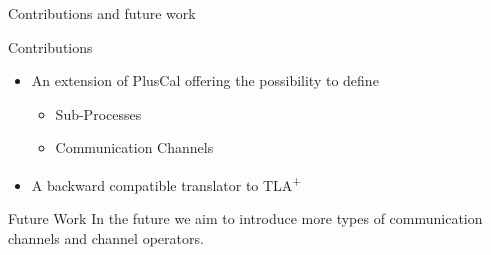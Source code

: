 \documentclass{beamer}
\newcommand{\tlaplus}{TLA\textsuperscript{+}\xspace}
\begin{document}
\begin{frame}{Contributions and future work}
\begin{block}{Contributions}
\begin{itemize}
    \item An extension of PlusCal offering the possibility to define
        \begin{itemize}
            \item Sub-Processes
            \item Communication Channels
        \end{itemize}

    \item A backward compatible translator to \tlaplus

\end{itemize}
\end{block}
\begin{block}{Future Work}
In the future we aim to introduce more types of communication channels and channel operators.
\end{block}

\end{frame}
\end{document}
